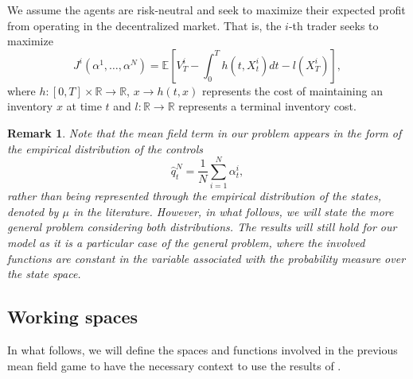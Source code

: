 \documentclass[11pt]{article}
\newtheorem*{obs*}{Remark}
\theoremstyle{definition}
\begin{document}
We assume the agents are risk-neutral and seek to maximize their expected profit from operating in the decentralized market. That is, the $i$-th trader seeks to maximize
\begin{equation}\label{profit}
J^i(\alpha^1, \dots, \alpha^N) = \mathbb{E}\left[V_T^i - \int_0^T h(t, X_t^i) dt - l(X_T^i) \right],    
\end{equation}
where $h : [0,T] \times \mathbb{R} \to \mathbb{R}$, $x \to h(t,x)$ represents the cost of maintaining an inventory $x$ at time $t$ and $l : \mathbb{R} \to \mathbb{R}$ represents a terminal inventory cost.

\begin{obs*}
    Note that the mean field term in our problem appears in the form of the empirical distribution of the controls 
    \begin{equation}\label{control}
        \hat{q}_t^N = \frac{1}{N} \sum_{i=1}^{N} \alpha_t^i,
    \end{equation}
     rather than being represented through the empirical distribution of the states, denoted by $\mu$ in the literature. However, in what follows, we will state the more general problem considering both distributions. The results will still hold for our model as it is a particular case of the general problem, where the involved functions are constant in the variable associated with the probability measure over the state space.
\end{obs*} 

\subsection*{Working spaces}
In what follows, we will define the spaces and functions involved in the previous mean field game to have the necessary context to use the results of \citep{carmona2015weakmfgformulation}.
\end{document}
